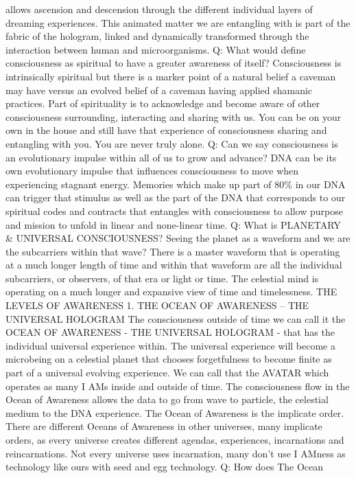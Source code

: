 allows ascension and descension through the different individual layers
of dreaming experiences. This animated matter we are entangling with is
part of the fabric of the hologram, linked and dynamically transformed
through the interaction between human and microorganisms. Q: What would
define consciousness as spiritual to have a greater awareness of itself?
Consciousness is intrinsically spiritual but there is a marker point of
a natural belief a caveman may have versus an evolved belief of a
caveman having applied shamanic practices. Part of spirituality is to
acknowledge and become aware of other consciousness surrounding,
interacting and sharing with us. You can be on your own in the house and
still have that experience of consciousness sharing and entangling with
you. You are never truly alone. Q: Can we say consciousness is an
evolutionary impulse within all of us to grow and advance? DNA can be
its own evolutionary impulse that influences consciousness to move when
experiencing stagnant energy. Memories which make up part of 80\% in our
DNA can trigger that stimulus as well as the part of the DNA that
corresponds to our spiritual codes and contracts that entangles with
consciousness to allow purpose and mission to unfold in linear and
none-linear time. Q: What is PLANETARY \& UNIVERSAL CONSCIOUSNESS?
Seeing the planet as a waveform and we are the subcarriers within that
wave? There is a master waveform that is operating at a much longer
length of time and within that waveform are all the individual
subcarriers, or observers, of that era or light or time. The celestial
mind is operating on a much longer and expansive view of time and
timelessness. THE LEVELS OF AWARENESS 1. THE OCEAN OF AWARENESS -- THE
UNIVERSAL HOLOGRAM The consciousness outside of time we can call it the
OCEAN OF AWARENESS - THE UNIVERSAL HOLOGRAM - that has the individual
universal experience within. The universal experience will become a
microbeing on a celestial planet that chooses forgetfulness to become
finite as part of a universal evolving experience. We can call that the
AVATAR which operates as many I AMs inside and outside of time. The
consciousness flow in the Ocean of Awareness allows the data to go from
wave to particle, the celestial medium to the DNA experience. The Ocean
of Awareness is the implicate order. There are different Oceans of
Awareness in other universes, many implicate orders, as every universe
creates different agendas, experiences, incarnations and reincarnations.
Not every universe uses incarnation, many don't use I AMness as
technology like ours with seed and egg technology. Q: How does The Ocean
